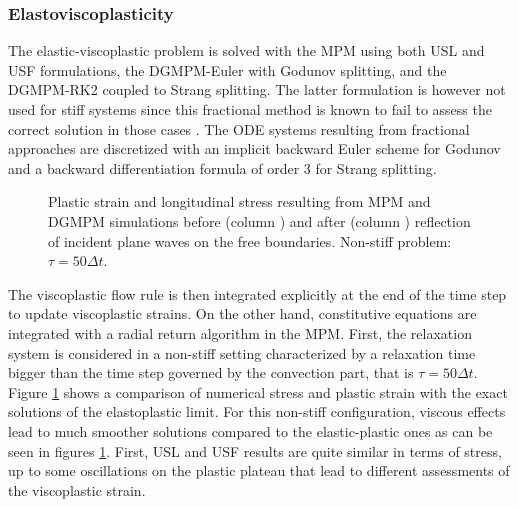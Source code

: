 \subsubsection{Elastoviscoplasticity}
The elastic-viscoplastic problem is solved with the MPM using both USL and USF formulations, the DGMPM-Euler with Godunov splitting, and the DGMPM-RK2 coupled to Strang splitting.
The latter formulation is however not used for stiff systems since this fractional method is known to fail to assess the correct solution in those cases \cite{Thomas_EVP,Leveque_stiff}.
The ODE systems resulting from fractional approaches are discretized with an implicit backward Euler scheme for Godunov and a backward differentiation formula of order 3 for Strang splitting.
\begin{figure}[h!]
  \centering
  { \label{subfig:evp_nonstiff1}}
  { \label{subfig:evp_nonstiff3}}
  {}
  \caption{Plastic strain and longitudinal stress resulting from MPM and DGMPM simulations before (column ) and after (column ) reflection of incident plane waves on the free boundaries. Non-stiff problem: $\tau=50\Delta t$.}
  \label{fig:nonstiff_elastoviscoplastic_RP}
\end{figure}
The viscoplastic flow rule is then integrated explicitly at the end of the time step to update viscoplastic strains.
On the other hand, constitutive equations are integrated with a radial return algorithm \cite{Simo} in the MPM.
First, the relaxation system is considered in a non-stiff setting characterized by a relaxation time bigger than the time step governed by the convection part, that is $\tau=50\Delta t$.
Figure \ref{fig:nonstiff_elastoviscoplastic_RP} shows a comparison of numerical stress and plastic strain with the exact solutions of the elastoplastic limit.
For this non-stiff configuration, viscous effects lead to much smoother solutions compared to the elastic-plastic ones as can be seen in figures \ref{fig:nonstiff_elastoviscoplastic_RP}.
First, USL and USF results are quite similar in terms of stress, up to some oscillations on the plastic plateau that lead to different assessments of the viscoplastic strain. 
